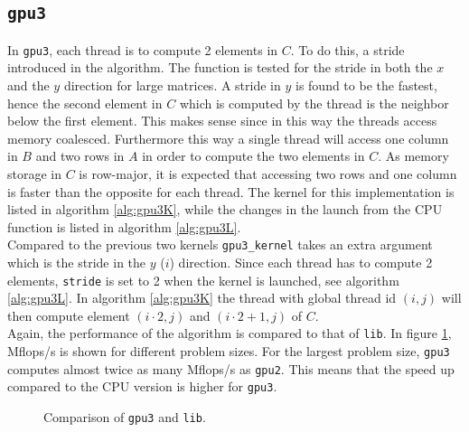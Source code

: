 \subsection{\texttt{gpu3}}
In \texttt{gpu3}, each thread is to compute 2 elements in $C$. To do this, a stride introduced in the algorithm. The function is tested for the stride in both the $x$ and the $y$ direction for large matrices. A stride in $y$ is found to be the fastest, hence the second element in $C$ which is computed by the thread is the neighbor below the first element. This makes sense since in this way the threads access memory coalesced. Furthermore this way a single thread will access one column in $B$ and two rows in $A$ in order to compute the two elements in $C$. As memory storage in $C$ is row-major, it is expected that accessing two rows and one column is faster than the opposite for each thread. The kernel for this implementation is listed in algorithm \ref{alg:gpu3K}, while the changes in the launch from the CPU function is listed in algorithm \ref{alg:gpu3L}.\\
\noindent Compared to the previous two kernels \texttt{gpu3\_kernel} takes an extra argument which is the stride in the $y$ ($i$) direction. Since each thread has to compute 2 elements, \texttt{stride} is set to 2 when the kernel is launched, see algorithm \ref{alg:gpu3L}. In algorithm \ref{alg:gpu3K} the thread with global thread id $(i,j)$ will then compute element $(i\cdot 2, j)$ and $(i\cdot 2 + 1, j)$ of $C$. \\




\noindent Again, the performance of the algorithm is compared to that of \texttt{lib}. In figure \ref{fig:compare_gpu3}, Mflops/s is shown for different problem sizes. For the largest problem size, \texttt{gpu3} computes almost twice as many Mflops/s as \texttt{gpu2}. This means that the speed up compared to the CPU version is higher for \texttt{gpu3}.
\begin{figure}[H]
\centering
{}
\caption{Comparison of \texttt{gpu3} and \texttt{lib}.}
\label{fig:compare_gpu3}
\end{figure}


